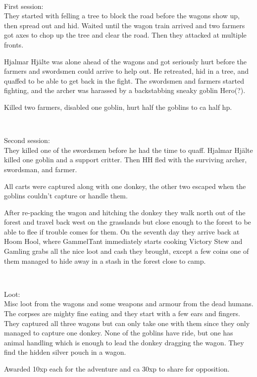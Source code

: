 \

First session: \\                                                       %
They started with felling a tree to block the road before the wagons show up, then spread out and hid. Waited until the wagon train arrived and two farmers got axes to chop up the tree and clear the road. Then they attacked at multiple fronts.

Hjalmar Hjälte was alone ahead of the wagons and got seriously hurt before the farmers and swordsmen could arrive to help out. He retreated, hid in a tree, and quaffed to be able to get back in the fight. The swordsmen and farmers started fighting, and the archer was harassed by a backstabbing sneaky goblin Hero(?).

Killed two farmers, disabled one goblin, hurt half the goblins to ca half hp.

\

Second session: \\                                                      %
They killed one of the swordsmen before he had the time to quaff. Hjalmar Hjälte killed one goblin and a support critter. Then HH fled with the surviving archer, swordsman, and farmer.

All carts were captured along with one donkey, the other two escaped when the goblins couldn't capture or handle them.

After re-packing the wagon and hitching the donkey they walk north out of the forest and travel back west on the grasslands but close enough to the forest to be able to flee if trouble comes for them. On the seventh day they arrive back at Hoom Hool, where GammelTant immediately starts cooking Victory Stew and Gamling grabs all the nice loot and cash they brought, except a few coins one of them managed to hide away in a stash in the forest close to camp.

\

Loot: \\
Misc loot from the wagons and some weapons and armour from the dead humans. The corpses are mighty fine eating and they start with a few ears and fingers.
They captured all three wagons but can only take one with them since they only managed to capture one donkey. None of the goblins have ride, but one has animal handling which is enough to lead the donkey dragging the wagon. They find the hidden silver pouch in a wagon.

Awarded 10xp each for the adventure and ca 30xp to share for opposition.


